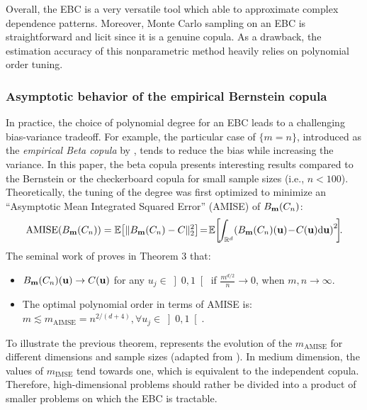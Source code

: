 Overall, the EBC is a very versatile tool which able to approximate complex dependence patterns. 
Moreover, Monte Carlo sampling on an EBC is straightforward and licit since it is a genuine copula. 
As a drawback, the estimation accuracy of this nonparametric method heavily relies on polynomial order tuning.   


\subsubsection{Asymptotic behavior of the empirical Bernstein copula}
In practice, the choice of polynomial degree for an EBC leads to a challenging bias-variance tradeoff. 
For example, the particular case of $\{m = n\}$, introduced as the \textit{empirical Beta copula} by \cite{segers_2017}, tends to reduce the bias while increasing the variance. 
In this paper, the beta copula presents interesting results compared to the Bernstein or the checkerboard copula for small sample sizes (i.e., $n<100$). 
Theoretically, the tuning of the degree was first optimized to minimize an ``Asymptotic Mean Integrated Squared Error'' (AMISE) of $B_{{\bf m}}(C_n)$: 
\begin{equation}
    \mathrm{AMISE}(B_{\bm}(C_n)) = \E\!\left[ \lVert B_{\bm}(C_n) - C \rVert^2_2 \right] \!=\! \E\!\left[\!\int_{\R^d}\! \left(B_{\bm}(C_n)(\bu) \!-\! C(\bu) \dd \bu \right)^2 \!\right]\!\!.
    \label{eq:aimse}
\end{equation}
The seminal work of \citet{sancetta_satchell_2004} proves in Theorem 3 that: 
\begin{itemize}
    \item $B_{{\bf m}}(C_n)({\bf u}) \rightarrow C({\bf u})$ for any $u_j \in \left]0, 1\right[$ if $\frac{m^{d/2}}{n} \rightarrow 0$, when $m, n \rightarrow \infty$.
    \item The optimal polynomial order in terms of AMISE is\footnotemark: $m \lesssim m_{\mathrm{AIMSE}} = n^{2/(d+4)}, \forall u_j \in \left]0, 1\right[$.    
\end{itemize}
To illustrate the previous theorem,  represents the evolution of the $m_{\mathrm{AMISE}}$ for different dimensions and sample sizes (adapted from \citealp{lasserre_2022}). 
In medium dimension, the values of $m_{\mathrm{IMSE}}$ tend towards one, which is equivalent to the independent copula. 
Therefore, high-dimensional problems should rather be divided into a product of smaller problems on which the EBC is tractable.

